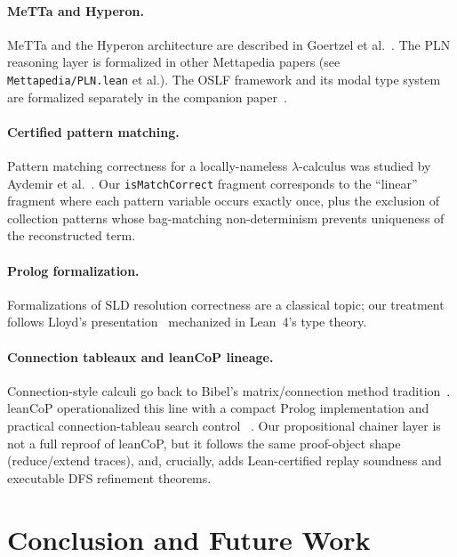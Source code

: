 \documentclass[]{article}
\newcommand{\code}[1]{\texttt{#1}}
\newcommand{\MeTTa}{\textup{MeTTa}}
\newcommand{\OSLF}{\textup{OSLF}}
\begin{document}
\paragraph{\MeTTa{} and Hyperon.}
MeTTa and the Hyperon architecture are described in Goertzel et al.~\cite{goertzel2009pln}.
The PLN reasoning layer is formalized in other Mettapedia papers
(see \code{Mettapedia/PLN.lean} et al.).
The \OSLF{} framework and its modal type system are formalized separately
in the companion paper~\cite{leanOSLF2025}.

\paragraph{Certified pattern matching.}
Pattern matching correctness for a locally-nameless $\lambda$-calculus was studied
by Aydemir et al.~\cite{AydemarPOPL2008}.  Our \code{isMatchCorrect} fragment
corresponds to the ``linear'' fragment where each pattern variable occurs exactly
once, plus the exclusion of collection patterns whose bag-matching non-determinism
prevents uniqueness of the reconstructed term.

\paragraph{Prolog formalization.}
Formalizations of SLD resolution correctness are a classical topic; our treatment
follows Lloyd's presentation~\cite{Lloyd1987} mechanized in Lean~4's type theory.

\paragraph{Connection tableaux and leanCoP lineage.}
Connection-style calculi go back to Bibel's matrix/connection method
tradition~\cite{Bibel1987}.  leanCoP operationalized this line with a compact
Prolog implementation and practical connection-tableau search control
~\cite{Otten2010leanCoP}.  Our propositional chainer layer is not a full reproof
of leanCoP, but it follows the same proof-object shape (reduce/extend traces),
and, crucially, adds Lean-certified replay soundness and executable DFS
refinement theorems.

\section{Conclusion and Future Work}
\label{sec:conclusion}
\end{document}
